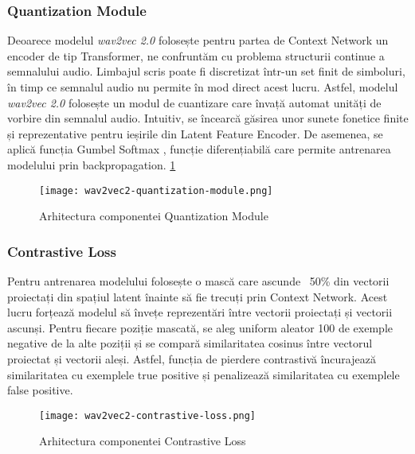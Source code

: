 \vspace{3em}

\subsubsection{Quantization Module} 
Deoarece modelul \textit{wav2vec 2.0} folosește pentru partea de Context Network un encoder de tip
Transformer, ne confruntăm cu problema structurii continue a semnalului audio. Limbajul scris poate
fi discretizat într-un set finit de simboluri, în timp ce semnalul audio nu permite în mod direct
acest lucru. Astfel, modelul \textit{wav2vec 2.0} folosește un modul de cuantizare care învață automat
unități de vorbire din semnalul audio. Intuitiv, se încearcă găsirea unor sunete fonetice 
finite și reprezentative pentru ieșirile din Latent Feature Encoder. De asemenea, se aplică 
funcția Gumbel Softmax \cite{gumbel-softmax}, funcție diferențiabilă care permite antrenarea modelului
prin backpropagation. \ref{fig:wav2vec2-quantization-module}

\begin{figure}[h]
    \centering
    \texttt{[image: wav2vec2-quantization-module.png]}
    \caption{Arhitectura componentei Quantization Module \protect\footnotemark[1]}
    \label{fig:wav2vec2-quantization-module}
\end{figure}

\subsubsection{Contrastive Loss}
Pentru antrenarea modelului folosește o mască care ascunde ~50\% din vectorii proiectați din spațiul
latent înainte să fie trecuți prin Context Network. Acest lucru forțează modelul să învețe
reprezentări între vectorii proiectați și vectorii ascunși. Pentru fiecare poziție mascată, se
aleg uniform aleator 100 de exemple negative de la alte poziții și se compară similaritatea cosinus
între vectorul proiectat și vectorii aleși. Astfel, funcția de pierdere contrastivă încurajează
similaritatea cu exemplele true positive și penalizează similaritatea cu exemplele false positive.

\begin{figure}[h]
    \centering 
    \texttt{[image: wav2vec2-contrastive-loss.png]}
    \caption{Arhitectura componentei Contrastive Loss \protect\footnotemark[1]}
    \label{fig:wav2vec2-contrastive-loss}
\end{figure}

